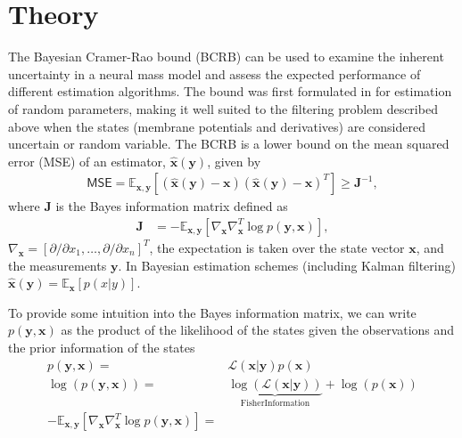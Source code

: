\documentclass{article}
\renewcommand{\vec}[1]{\ensuremath{{\boldsymbol #1}}}
\newcommand{\mat}[1]{\ensuremath{\boldsymbol{#1}}}
\begin{document}
\section{Theory}
The Bayesian Cramer-Rao bound (BCRB) can be used to examine the inherent uncertainty in a neural mass model and assess the expected performance of different estimation algorithms. The bound was first formulated in \cite{VanTrees1968} for estimation of random parameters, making it well suited to the filtering problem described above when the states (membrane potentials and derivatives) are considered uncertain or random variable. The BCRB is a lower bound on the mean squared error (MSE) of an estimator, $\hat{\vec x}(\vec y)$, given by
\begin{align}
	\mathsf{MSE} = \mathbb E_{\vec x,\vec y} [(\hat{\vec x}(\vec y) - \vec x)(\hat{\vec x}(\vec y) - \vec x)^T] \ge \mat J^{-1},
	\label{eqn:mse_bound}
\end{align}
where $\mat J$ is the Bayes information matrix defined as
\begin{align}
	\mat J &= -\mathbb E_{\vec x,\vec y}\left[ \nabla_{\vec x}\nabla_{\vec x}^T \log p(\vec y,\vec x) \right],
	\label{eqn:bayes_matrix}
\end{align}
$\nabla_{\vec x} = [\partial/\partial x_1,\ldots,\partial/\partial x_n]^T$, the expectation is taken over the state vector $\vec x$, and the measurements $\vec y$. In Bayesian estimation schemes (including Kalman filtering) $\hat{\vec x}(\vec y) = \mathbb{E}_{\vec x}\left[p\left(x|y\right)\right]$. 

To provide some intuition into the Bayes information matrix, we can write $p(\vec y,\vec x)$ as the product of the likelihood of the states given the observations and the prior information of the states
\begin{align}
	p(\vec y,\vec x) =& \mathcal{L}(\vec x|\vec y) p(\vec x) \\
	\log(p(\vec y,\vec x)) =& \underbrace{\log\left(\mathcal{L}(\vec x|\vec y)\right)}_{\mathrm{Fisher Information}} + \log\left(p(\vec x)\right) \\
	-\mathbb E_{\vec x,\vec y}\left[ \nabla_{\vec x}\nabla_{\vec x}^T \log p(\vec y,\vec x) \right] =& 
\end{align}
\end{document}
